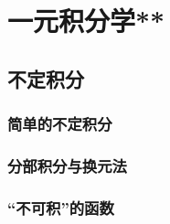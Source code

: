 \chapter{一元积分学**}
\section{不定积分}
\subsection{简单的不定积分}
\clearpage
\subsection{分部积分与换元法}
\clearpage
\subsection{“不可积”的函数}
\clearpage
